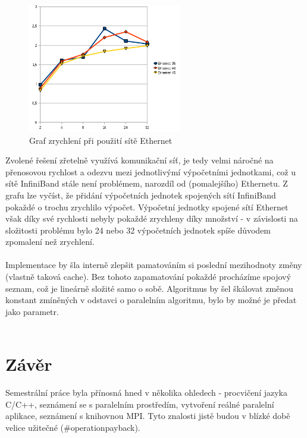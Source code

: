 \documentclass[12pt]{article}
\begin{document}
\begin{figure}[H]
\begin{center}
\includegraphics[width=0.6\textwidth]{par/eth}
\caption{Graf zrychlení při použití sítě Ethernet}
\label{fig:eth}
\end{center}
\end{figure}

Zvolené řešení zřetelně využívá komunikační síť, je tedy velmi náročné na přenosovou rychlost a odezvu mezi jednotlivýmí výpočetními jednotkami, což u sítě InfiniBand stále není problémem, narozdíl od (pomalejšího) Ethernetu. Z grafu lze vyčíst, že přidání výpočetních jednotek spojených sítí InfiniBand pokaždé o trochu zrychlilo výpočet. Výpočetní jednotky spojené sítí Ethernet však díky své rychlosti nebyly pokaždé zrychleny díky množství - v závislosti na složitosti problému bylo 24 nebo 32 výpočetních jednotek spíše důvodem zpomalení než zrychlení.\\
\\
Implementace by šla interně zlepšit pamatováním si poslední mezihodnoty změny (vlastně taková cache). Bez tohoto zapamatování pokaždé procházíme spojový seznam, což je lineárně složité samo o sobě. Algoritmus by šel škálovat změnou konstant zmíněných v odstavci o paralelním algoritmu, bylo by možné je předat jako parametr.\\
\\

\section{Závěr}

Semestrální práce byla přínosná hned v několika ohledech - procvičení jazyka C/C++, seznámení se s paralelním prostředím, vytvoření reálné paralelní aplikace, seznámení s knihovnou MPI. Tyto znalosti jistě budou v blízké době velice užitečné (\#operationpayback).
\end{document}
